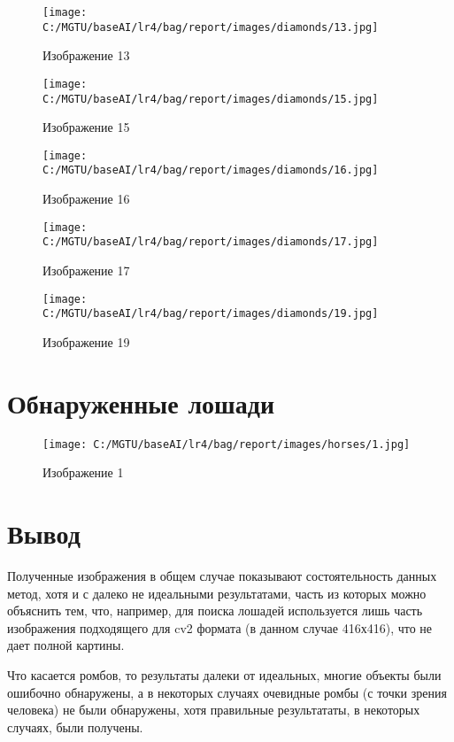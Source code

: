 \begin{figure}[H]
    \centering
    \texttt{[image: C:/MGTU/baseAI/lr4/bag/report/images/diamonds/13.jpg]}
    \caption{Изображение 13}
\end{figure}

\begin{figure}[H]
    \centering
    \texttt{[image: C:/MGTU/baseAI/lr4/bag/report/images/diamonds/15.jpg]}
    \caption{Изображение 15}
\end{figure}

\begin{figure}[H]
    \centering
    \texttt{[image: C:/MGTU/baseAI/lr4/bag/report/images/diamonds/16.jpg]}
    \caption{Изображение 16}
\end{figure}

\begin{figure}[H]
    \centering
    \texttt{[image: C:/MGTU/baseAI/lr4/bag/report/images/diamonds/17.jpg]}
    \caption{Изображение 17}
\end{figure}

\begin{figure}[H]
    \centering
    \texttt{[image: C:/MGTU/baseAI/lr4/bag/report/images/diamonds/19.jpg]}
    \caption{Изображение 19}
\end{figure}

\section{Обнаруженные лошади}

\begin{figure}[H]
    \centering
    \texttt{[image: C:/MGTU/baseAI/lr4/bag/report/images/horses/1.jpg]}
    \caption{Изображение 1}
\end{figure}

\section{Вывод}

Полученные изображения в общем случае показывают состоятельность данных метод, 
хотя и с далеко не идеальными результатами, часть из которых можно объяснить тем, 
что, например, для поиска лошадей используется лишь часть изображения подходящего
для cv2 формата (в данном случае 416х416), что не дает полной картины.

Что касается ромбов, то результаты далеки от идеальных, многие объекты были ошибочно обнаружены, 
а в некоторых случаях очевидные ромбы (с точки зрения человека) не были обнаружены, 
хотя правильные результататы, в некоторых случаях, были получены.

\clearpage
